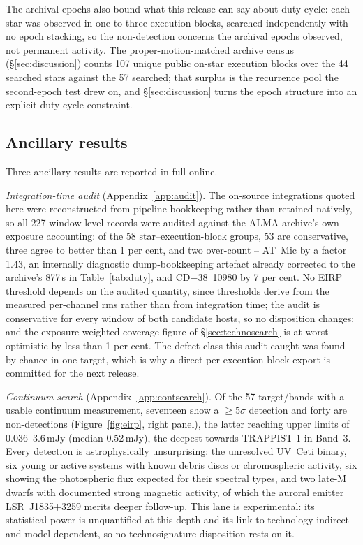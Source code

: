 \documentclass{openjournal}
\begin{document}
The archival epochs also bound what this release can say about duty
cycle: each star was observed in one to three execution blocks,
searched independently with no epoch stacking, so the non-detection
concerns the archival epochs observed, not permanent activity. The
proper-motion-matched archive census (\S\ref{sec:discussion}) counts
107 unique public on-star execution blocks over the 44 searched stars
against the 57 searched; that surplus is the recurrence pool the
second-epoch test drew on, and \S\ref{sec:discussion} turns the epoch
structure into an explicit duty-cycle constraint.
\subsection{Ancillary results}
\label{sec:ancillaryresults}

Three ancillary results are reported in full online.

\emph{Integration-time audit} (Appendix~\ref{app:audit}). The
on-source integrations quoted here were reconstructed from pipeline
bookkeeping rather than retained natively, so all 227 window-level
records were audited against the ALMA archive's own exposure
accounting: of the 58 star--execution-block groups, 53 are
conservative, three agree to better than 1 per cent, and two
over-count -- AT~Mic by a factor 1.43, an internally diagnostic
dump-bookkeeping artefact already corrected to the archive's 877\,s in
Table~\ref{tab:duty}, and CD$-$38~10980 by 7 per cent. No EIRP
threshold depends on the audited quantity, since thresholds derive
from the measured per-channel rms rather than from integration time;
the audit is conservative for every window of both candidate hosts, so
no disposition changes; and the exposure-weighted coverage figure of
\S\ref{sec:technosearch} is at worst optimistic by less than 1 per
cent. The defect class this audit caught was found by chance in one
target, which is why a direct per-execution-block export is committed
for the next release.

\emph{Continuum search} (Appendix~\ref{app:contsearch}). Of the 57
target/bands with a usable continuum measurement, seventeen show a
$\geq5\sigma$ detection and forty are non-detections
(Figure~\ref{fig:eirp}, right panel), the latter reaching upper limits
of 0.036--3.6\,mJy (median 0.52\,mJy), the deepest towards TRAPPIST-1
in Band~3. Every detection is astrophysically unsurprising: the
unresolved UV~Ceti binary, six young or active systems with known
debris discs or chromospheric activity, six showing the photospheric
flux expected for their spectral types, and two late-M dwarfs with
documented strong magnetic activity, of which the auroral emitter
LSR~J1835$+$3259 merits deeper follow-up. This lane is experimental:
its statistical power is unquantified at this depth and its link to
technology indirect and model-dependent, so no technosignature
disposition rests on it.
\end{document}
